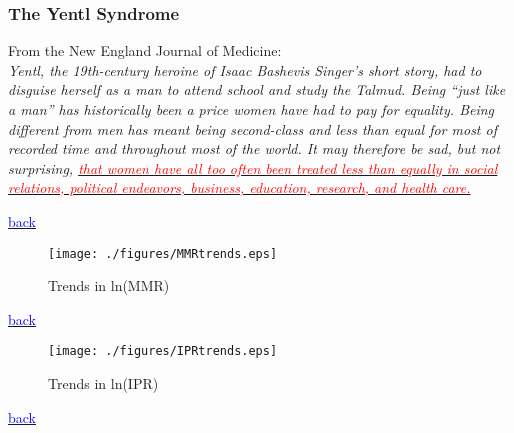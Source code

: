 \documentclass[10pt,letterpaper,subeqn]{beamer}
\begin{document}
\begin{frame}[label=Yentl]
\frametitle{The Yentl Syndrome}
From the New England Journal of Medicine: \\
\vspace{4mm}
\textit{Yentl, the 19th-century heroine of Isaac Bashevis Singer's short story, 
had to disguise herself as a man to attend school and study the Talmud. Being 
``just like a man'' has historically been a price women have had to pay for 
equality. Being different from men has meant being second-class and less than 
equal for most of recorded time and throughout most of the world. It may therefore 
be sad, but not surprising, \hyperlink{intro}{\textcolor{red}{that women have all 
too often been treated less than equally in social relations, political endeavors, 
business, education, research, and health care.}}}\\
\end{frame}



\begin{frame}[plain,label=DDreg]

{\footnotesize \hyperlink{USA}{\textcolor{blue}{back}}}
\end{frame}


\begin{frame}[plain,label=ptrends]
\begin{figure}[h!]
\centering
\caption{Trends in ln(MMR)}
\texttt{[image: ./figures/MMRtrends.eps]}
\end{figure}
{\footnotesize \hyperlink{USA}{\textcolor{blue}{back}}}
\end{frame}

\begin{frame}[plain,label=ptrends]
\begin{figure}[h!]
\centering
\caption{Trends in ln(IPR)}
\texttt{[image: ./figures/IPRtrends.eps]}
\end{figure}
{\footnotesize \hyperlink{USA}{\textcolor{blue}{back}}}
\end{frame}
\end{document}
